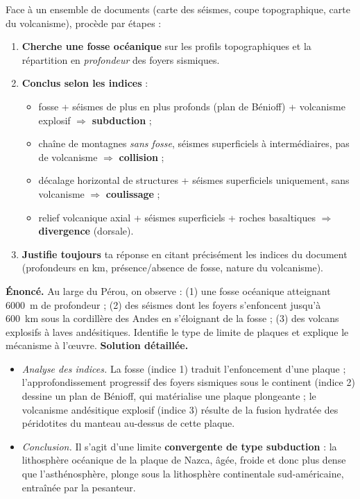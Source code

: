 \documentclass[11pt]{article}
\begin{document}
\begin{methode}
Face à un ensemble de documents (carte des séismes, coupe topographique, carte du volcanisme), procède par étapes :
\begin{enumerate}
\item \textbf{Cherche une fosse océanique} sur les profils topographiques et la répartition en \emph{profondeur} des foyers sismiques.
\item \textbf{Conclus selon les indices} :
\begin{itemize}
\item fosse + séismes de plus en plus profonds (plan de Bénioff) + volcanisme explosif $\Rightarrow$ \textbf{subduction} ;
\item chaîne de montagnes \emph{sans fosse}, séismes superficiels à intermédiaires, pas de volcanisme $\Rightarrow$ \textbf{collision} ;
\item décalage horizontal de structures + séismes superficiels uniquement, sans volcanisme $\Rightarrow$ \textbf{coulissage} ;
\item relief volcanique axial + séismes superficiels + roches basaltiques $\Rightarrow$ \textbf{divergence} (dorsale).
\end{itemize}
\item \textbf{Justifie toujours} ta réponse en citant précisément les indices du document (profondeurs en km, présence/absence de fosse, nature du volcanisme).
\end{enumerate}
\end{methode}

\begin{exoresolu}
\textbf{Énoncé.} Au large du Pérou, on observe : (1) une fosse océanique atteignant \SI{6000}{m} de profondeur ; (2) des séismes dont les foyers s'enfoncent jusqu'à \SI{600}{km} sous la cordillère des Andes en s'éloignant de la fosse ; (3) des volcans explosifs à laves andésitiques. Identifie le type de limite de plaques et explique le mécanisme à l'œuvre.
\tcblower
\textbf{Solution détaillée.}
\begin{itemize}
\item \emph{Analyse des indices.} La fosse (indice 1) traduit l'enfoncement d'une plaque ; l'approfondissement progressif des foyers sismiques sous le continent (indice 2) dessine un plan de Bénioff, qui matérialise une plaque plongeante ; le volcanisme andésitique explosif (indice 3) résulte de la fusion hydratée des péridotites du manteau au-dessus de cette plaque.
\item \emph{Conclusion.} Il s'agit d'une limite \textbf{convergente de type subduction} : la lithosphère océanique de la plaque de Nazca, âgée, froide et donc plus dense que l'asthénosphère, plonge sous la lithosphère continentale sud-américaine, entraînée par la pesanteur.
\end{itemize}
\end{exoresolu}
\end{document}
